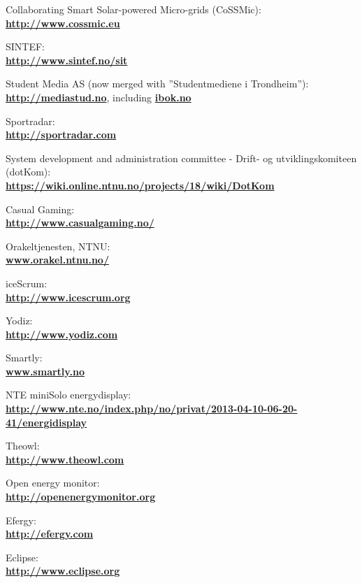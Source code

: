 \begin{thebibliography}{1}

 Collaborating Smart Solar-powered Micro-grids (CoSSMic):\\ \textbf{\url{http://www.cossmic.eu}}

 SINTEF: \\
\textbf{ \url{ http://www.sintef.no/sit}}

 Student Media AS (now merged with ''Studentmediene i Trondheim''):\\
\textbf{ \url{http://mediastud.no}}, including \textbf{ \url{ibok.no}}

 Sportradar:\\
\textbf{ \url{http://sportradar.com}}

 System development and administration committee - Drift- og utviklingskomiteen (dotKom):\\
\textbf{ \url{https://wiki.online.ntnu.no/projects/18/wiki/DotKom}}

 Casual Gaming:\\
\textbf{ \url{http://www.casualgaming.no/}}

 Orakeltjenesten, NTNU:\\
\textbf{ \url{www.orakel.ntnu.no/}}

 iceScrum: \\
\textbf{ \url{http://www.icescrum.org}}

 Yodiz: \\
\textbf{ \url{ http://www.yodiz.com}}
        
 Smartly: \\
\textbf{ \url{www.smartly.no}}

 NTE miniSolo energydisplay:\\
\textbf{ \url{http://www.nte.no/index.php/no/privat/2013-04-10-06-20-41/energidisplay}}

 Theowl:\\
\textbf{ \url{http://www.theowl.com}}

 Open energy monitor:\\
\textbf{ \url{http://openenergymonitor.org}}

 Efergy:\\
\textbf{ \url{http://efergy.com}}

 Eclipse:\\
\textbf{ \url{http://www.eclipse.org}}


\end{thebibliography}
